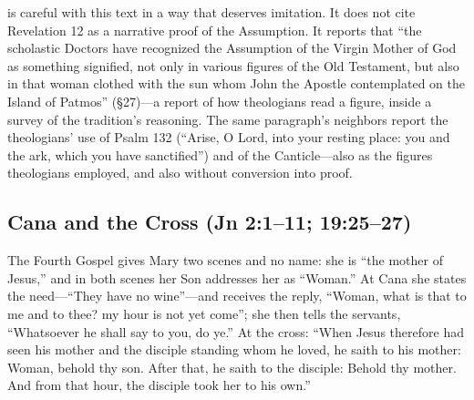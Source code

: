  is careful with this text in a way that
deserves imitation. It does not cite Revelation 12 as a narrative proof
of the Assumption. It reports that ``the scholastic Doctors have
recognized the Assumption of the Virgin Mother of God as something
signified, not only in various figures of the Old Testament, but also in
that woman clothed with the sun whom John the Apostle contemplated on the
Island of Patmos'' (\S27)---a report of how theologians read a figure,
inside a survey of the tradition's reasoning. The same paragraph's neighbors report the
theologians' use of Psalm 132 (``Arise, O Lord, into your resting place:
you and the ark, which you have sanctified'') and of the Canticle---also
as the figures theologians employed, and also without conversion into
proof.

\subsection*{Cana and the Cross (Jn 2:1--11; 19:25--27)}

The Fourth Gospel gives Mary two scenes and no name: she is ``the mother
of Jesus,'' and in both scenes her Son addresses her as ``Woman.'' At
Cana she states the need---``They have no wine''---and receives the
reply, ``Woman, what is that to me and to thee? my hour is not yet
come''; she then tells the servants, ``Whatsoever he shall say to you, do
ye.'' At the cross: ``When Jesus therefore had seen his mother and
the disciple standing whom he loved, he saith to his mother: Woman,
behold thy son. After that, he saith to the disciple: Behold thy mother.
And from that hour, the disciple took her to his own.''

